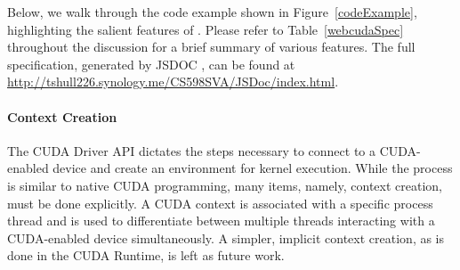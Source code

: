 Below, we walk through the code example shown in Figure~\ref{codeExample},
highlighting the salient features of \namens. Please refer to
Table~\ref{webcudaSpec} throughout the discussion for a brief summary of 
various \name features. The full \name specification, generated by JSDOC
\cite{JSDOC}, can be found at
\url{http://tshull226.synology.me/CS598SVA/JSDoc/index.html}.


\begin{figure*}
	\begin{center}
		\small
		
	\end{center}
	\caption{Simple \name Example}
	\label{codeExample}
\end{figure*}

\paragraph{Context Creation} The CUDA Driver API dictates the steps necessary to
connect to a CUDA-enabled device and create an environment for kernel execution.
While the process is similar to native CUDA programming, many items, namely,
context creation, must be done explicitly. A CUDA context is associated with a
specific process thread and is used to differentiate between multiple
threads interacting with a CUDA-enabled device simultaneously.  A simpler, implicit context creation, as is
done in the CUDA Runtime, is left as future work.

